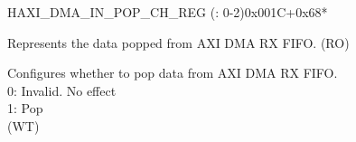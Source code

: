 \begin{register}{H}{AXI\_DMA\_IN\_POP\_CH\_REG (: 0-2)}{0x001C+0x68*}\label{regdesc:AXIDMAINPOPCHNREG}
%
%
%
\regnewline%
\begin{regdesc}\begin{reglist}
\label{fielddesc:AXIDMAINFIFORDATACHN}\item [AXI\_DMA\_INFIFO\_RDATA\_CH\regindex{n}] Represents the data popped from AXI DMA RX FIFO. (RO)
\label{fielddesc:AXIDMAINFIFOPOPCHN}\item [AXI\_DMA\_INFIFO\_POP\_CH\regindex{n}] Configures whether to pop data from AXI DMA RX FIFO.\\
0: Invalid. No effect\\
1: Pop\\ (WT)
\end{reglist}\end{regdesc}
\end{register}


